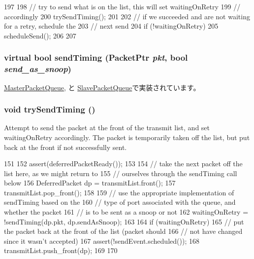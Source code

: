 \begin{DoxyCode}
197 {
198     // try to send what is on the list, this will set waitingOnRetry
199     // accordingly
200     trySendTiming();
201 
202     // if we succeeded and are not waiting for a retry, schedule the
203     // next send
204     if (!waitingOnRetry) {
205         scheduleSend();
206     }
207 }
\end{DoxyCode}
\hypertarget{classPacketQueue_a3111a75f1ac04df57de8a34ded64a82d}{
\subsubsection[{sendTiming}]{\setlength{\rightskip}{0pt plus 5cm}virtual bool sendTiming ({\bf PacketPtr} {\em pkt}, \/  bool {\em send\_\-as\_\-snoop})}}
\label{classPacketQueue_a3111a75f1ac04df57de8a34ded64a82d}


\hyperlink{classMasterPacketQueue_a49e787c20f2f8d3e4fc0b8213bebcfc4}{MasterPacketQueue}, と \hyperlink{classSlavePacketQueue_a49e787c20f2f8d3e4fc0b8213bebcfc4}{SlavePacketQueue}で実装されています。\hypertarget{classPacketQueue_a391c414b53eb45782e37bc539608e477}{
\subsubsection[{trySendTiming}]{\setlength{\rightskip}{0pt plus 5cm}void trySendTiming ()}}
\label{classPacketQueue_a391c414b53eb45782e37bc539608e477}
Attempt to send the packet at the front of the transmit list, and set waitingOnRetry accordingly. The packet is temporarily taken off the list, but put back at the front if not successfully sent. 


\begin{DoxyCode}
151 {
152     assert(deferredPacketReady());
153 
154     // take the next packet off the list here, as we might return to
155     // ourselves through the sendTiming call below
156     DeferredPacket dp = transmitList.front();
157     transmitList.pop_front();
158 
159     // use the appropriate implementation of sendTiming based on the
160     // type of port associated with the queue, and whether the packet
161     // is to be sent as a snoop or not
162     waitingOnRetry = !sendTiming(dp.pkt, dp.sendAsSnoop);
163 
164     if (waitingOnRetry) {
165         // put the packet back at the front of the list (packet should
166         // not have changed since it wasn't accepted)
167         assert(!sendEvent.scheduled());
168         transmitList.push_front(dp);
169     }
170 }
\end{DoxyCode}



